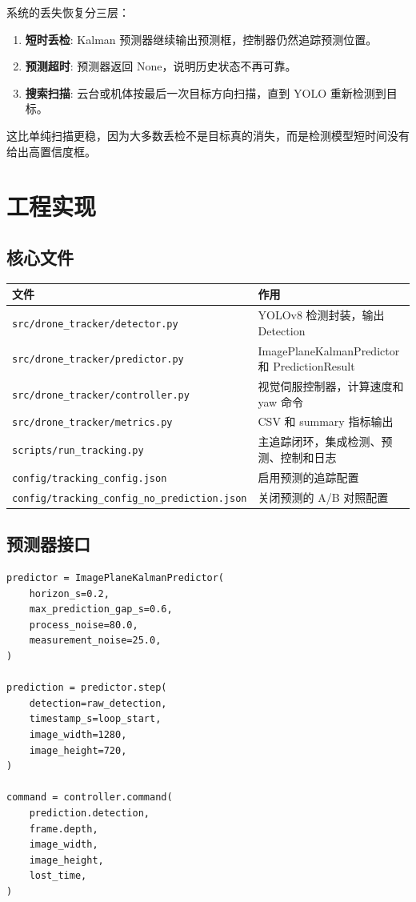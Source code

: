\documentclass[UTF8,a4paper,11pt]{ctexart}
\begin{document}
系统的丢失恢复分三层：

\begin{enumerate}
  \item \textbf{短时丢检}: Kalman 预测器继续输出预测框，控制器仍然追踪预测位置。
  \item \textbf{预测超时}: 预测器返回 None，说明历史状态不再可靠。
  \item \textbf{搜索扫描}: 云台或机体按最后一次目标方向扫描，直到 YOLO 重新检测到目标。
\end{enumerate}

这比单纯扫描更稳，因为大多数丢检不是目标真的消失，而是检测模型短时间没有给出高置信度框。

\section{工程实现}

\subsection{核心文件}

\begin{longtable}{>{\raggedright\arraybackslash}p{5cm}p{9cm}}
\toprule
文件 & 作用 \\
\midrule
\texttt{src/drone\_tracker/detector.py} & YOLOv8 检测封装，输出 Detection \\
\texttt{src/drone\_tracker/predictor.py} & ImagePlaneKalmanPredictor 和 PredictionResult \\
\texttt{src/drone\_tracker/controller.py} & 视觉伺服控制器，计算速度和 yaw 命令 \\
\texttt{src/drone\_tracker/metrics.py} & CSV 和 summary 指标输出 \\
\texttt{scripts/run\_tracking.py} & 主追踪闭环，集成检测、预测、控制和日志 \\
\texttt{config/tracking\_config.json} & 启用预测的追踪配置 \\
\texttt{config/tracking\_config\_no\_prediction.json} & 关闭预测的 A/B 对照配置 \\
\bottomrule
\end{longtable}

\subsection{预测器接口}

\begin{lstlisting}
predictor = ImagePlaneKalmanPredictor(
    horizon_s=0.2,
    max_prediction_gap_s=0.6,
    process_noise=80.0,
    measurement_noise=25.0,
)

prediction = predictor.step(
    detection=raw_detection,
    timestamp_s=loop_start,
    image_width=1280,
    image_height=720,
)

command = controller.command(
    prediction.detection,
    frame.depth,
    image_width,
    image_height,
    lost_time,
)
\end{lstlisting}
\end{document}
